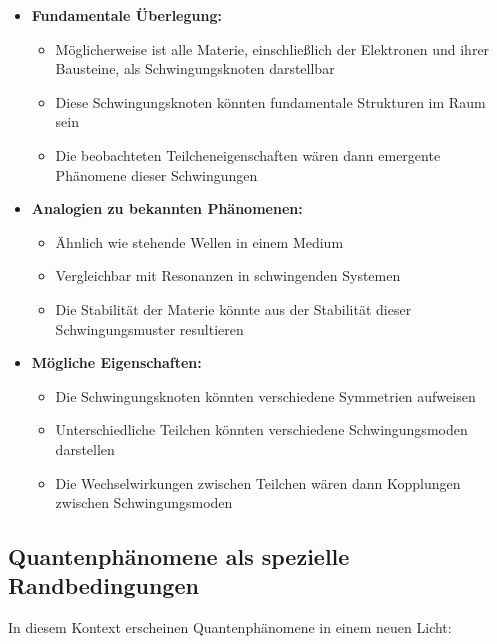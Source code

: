 \documentclass[12pt,a4paper]{article}
\begin{document}
\begin{itemize}
    \item \textbf{Fundamentale Überlegung:}
    \begin{itemize}
        \item Möglicherweise ist alle Materie, einschließlich der Elektronen und ihrer Bausteine, als Schwingungsknoten darstellbar
        \item Diese Schwingungsknoten könnten fundamentale Strukturen im Raum sein
        \item Die beobachteten Teilcheneigenschaften wären dann emergente Phänomene dieser Schwingungen
    \end{itemize}

    \item \textbf{Analogien zu bekannten Phänomenen:}
    \begin{itemize}
        \item Ähnlich wie stehende Wellen in einem Medium
        \item Vergleichbar mit Resonanzen in schwingenden Systemen
        \item Die Stabilität der Materie könnte aus der Stabilität dieser Schwingungsmuster resultieren
    \end{itemize}

    \item \textbf{Mögliche Eigenschaften:}
    \begin{itemize}
        \item Die Schwingungsknoten könnten verschiedene Symmetrien aufweisen
        \item Unterschiedliche Teilchen könnten verschiedene Schwingungsmoden darstellen
        \item Die Wechselwirkungen zwischen Teilchen wären dann Kopplungen zwischen Schwingungsmoden
    \end{itemize}
\end{itemize}

\subsection{Quantenphänomene als spezielle Randbedingungen}
In diesem Kontext erscheinen Quantenphänomene in einem neuen Licht:
\end{document}
